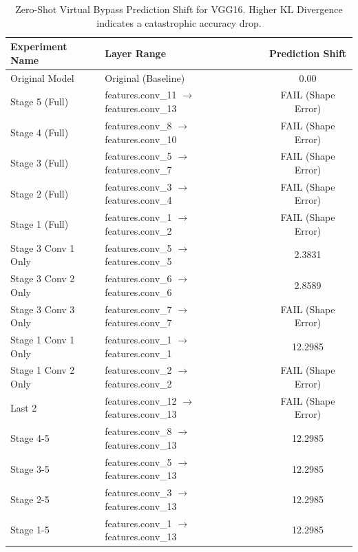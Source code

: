 \begin{table}[h]
\caption{Zero-Shot Virtual Bypass Prediction Shift for VGG16. Higher KL Divergence indicates a catastrophic accuracy drop.}
\label{tab:bypass_summary_vgg16}
\begin{tabular}{llc}
\toprule
Experiment Name & Layer Range & Prediction Shift \\
\midrule
Original Model & Original (Baseline) & 0.00 \\
Stage 5 (Full) & features.conv\_11 $\to$ features.conv\_13 & FAIL (Shape Error) \\
Stage 4 (Full) & features.conv\_8 $\to$ features.conv\_10 & FAIL (Shape Error) \\
Stage 3 (Full) & features.conv\_5 $\to$ features.conv\_7 & FAIL (Shape Error) \\
Stage 2 (Full) & features.conv\_3 $\to$ features.conv\_4 & FAIL (Shape Error) \\
Stage 1 (Full) & features.conv\_1 $\to$ features.conv\_2 & FAIL (Shape Error) \\
Stage 3 Conv 1 Only & features.conv\_5 $\to$ features.conv\_5 & 2.3831 \\
Stage 3 Conv 2 Only & features.conv\_6 $\to$ features.conv\_6 & 2.8589 \\
Stage 3 Conv 3 Only & features.conv\_7 $\to$ features.conv\_7 & FAIL (Shape Error) \\
Stage 1 Conv 1 Only & features.conv\_1 $\to$ features.conv\_1 & 12.2985 \\
Stage 1 Conv 2 Only & features.conv\_2 $\to$ features.conv\_2 & FAIL (Shape Error) \\
Last 2 & features.conv\_12 $\to$ features.conv\_13 & FAIL (Shape Error) \\
Stage 4-5 & features.conv\_8 $\to$ features.conv\_13 & 12.2985 \\
Stage 3-5 & features.conv\_5 $\to$ features.conv\_13 & 12.2985 \\
Stage 2-5 & features.conv\_3 $\to$ features.conv\_13 & 12.2985 \\
Stage 1-5 & features.conv\_1 $\to$ features.conv\_13 & 12.2985 \\
\bottomrule
\end{tabular}
\end{table}
